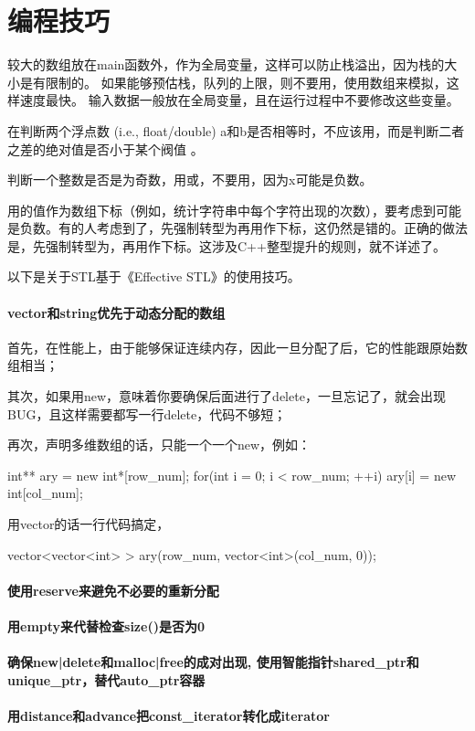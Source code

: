 \chapter{编程技巧}
较大的数组放在main函数外，作为全局变量，这样可以防止栈溢出，因为栈的大小是有限制的。
如果能够预估栈，队列的上限，则不要用，使用数组来模拟，这样速度最快。
输入数据一般放在全局变量，且在运行过程中不要修改这些变量。


在判断两个浮点数 (i.e., 
float/double) 
a和b是否相等时，不应该用，而是判断二者之差的绝对值是否小于某个阀值 
。

判断一个整数是否是为奇数，用或，不要用，因为x可能是负数。

用的值作为数组下标（例如，统计字符串中每个字符出现的次数），要考虑到可能是负数。有的人考虑到了，先强制转型为再用作下标，这仍然是错的。正确的做法是，先强制转型为，再用作下标。这涉及C++整型提升的规则，就不详述了。

以下是关于STL基于《Effective STL》的使用技巧。

\subsubsection{vector和string优先于动态分配的数组}
首先，在性能上，由于能够保证连续内存，因此一旦分配了后，它的性能跟原始数组相当；

其次，如果用new，意味着你要确保后面进行了delete，一旦忘记了，就会出现BUG，且这样需要都写一行delete，代码不够短；

再次，声明多维数组的话，只能一个一个new，例如：
\begin{Code}
	int** ary = new int*[row_num];
	for(int i = 0; i < row_num; ++i)
		ary[i] = new int[col_num];
\end{Code}

用vector的话一行代码搞定，
\begin{Code}
	vector<vector<int> > ary(row_num, vector<int>(col_num, 0));
\end{Code}
\subsubsection{使用reserve来避免不必要的重新分配}
\subsubsection{用empty来代替检查size()是否为0}
\subsubsection{确保new|delete和malloc|free的成对出现, 
使用智能指针shared_ptr和unique_ptr，替代auto_ptr容器}
\subsubsection{用distance和advance把const_iterator转化成iterator}